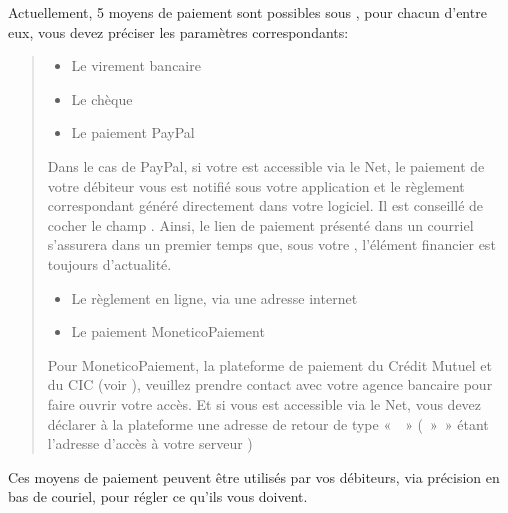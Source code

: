 \documentclass[a4paper,10pt,oneside,french]{sphinxmanual}
\begin{document}
\sphinxAtStartPar
Actuellement, 5 moyens de paiement sont possibles sous , pour chacun d’entre eux, vous devez préciser les paramètres correspondants:
\begin{quote}
\begin{itemize}
\item {} 
\sphinxAtStartPar
Le virement bancaire

\item {} 
\sphinxAtStartPar
Le chèque

\item {} 
\sphinxAtStartPar
Le paiement PayPal

\end{itemize}

\sphinxAtStartPar
Dans le cas de PayPal, si votre  est accessible via le Net, le paiement de votre débiteur vous est notifié sous votre application et le règlement correspondant généré directement dans votre logiciel.
Il est conseillé de cocher le champ . Ainsi, le lien de paiement présenté dans un courriel s’assurera dans un premier temps que, sous votre , l’élément financier est toujours d’actualité.
\begin{itemize}
\item {} 
\sphinxAtStartPar
Le règlement en ligne, via une adresse internet

\item {} 
\sphinxAtStartPar
Le paiement MoneticoPaiement

\end{itemize}

\sphinxAtStartPar
Pour MoneticoPaiement, la plateforme de paiement du Crédit Mutuel et du CIC (voir ), veuillez prendre contact avec votre agence bancaire pour faire ouvrir votre accès.
Et si vous  est accessible via le Net, vous devez déclarer à la plateforme une adresse de retour de type «  » ( » » étant l’adresse d’accès à votre serveur )
\end{quote}

\sphinxAtStartPar
Ces moyens de paiement peuvent être utilisés par vos débiteurs, via précision en bas de couriel, pour régler ce qu’ils vous doivent.
\end{document}
